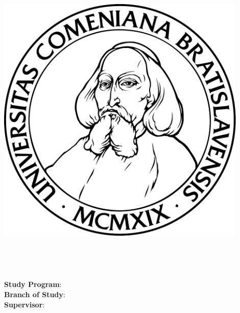 \ifx\draft\undefined
\thispagestyle{empty}
\begin{minipage}{0.20\textwidth}
	\includegraphics[width=0.9\textwidth]{../figures/logouni}
\end{minipage}
\begin{minipage}{0.79\textwidth}
\begin{center}
  \Large \sc \mfuniversity \\
  \mffaculty 
\end{center}
\end{minipage}
\vspace{7cm}
\begin{center}
  {\Huge \mftitle}\\
  \large \mfthesistype
\end{center}
\vspace{7cm}

\noindent
{\bf Study Program}: \mfstudyprogram\\
{\bf Branch of Study}: \mfbranchofstudy\\
{\bf Supervisor}: \mfadvisor

\vfill
\noindent
\mfplacedate \hfill {\large \mfauthor}\\

